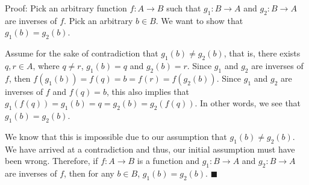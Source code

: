 \documentclass{article}
\renewcommand{\(}{\left(}
\renewcommand{\)}{\right)}
\theoremstyle{plain}
\theoremstyle{plain}
\theoremstyle{definition}
\begin{document}
    \begin{shaded}

        Proof: Pick an arbitrary function $f:A\to B$ such that $g_{1}:B\to A$ and $g_{2}:B\to A$ are inverses of $f$. Pick an arbitrary $b\in B$. We want to show that $g_{1}(b)=g_{2}(b)$.

        \vspace{4mm}

        Assume for the sake of contradiction that $g_{1}(b)\neq g_{2}(b)$, that is, there exists $q,r\in A$, where $q\neq r$, $g_{1}(b)=q$ and $g_{2}(b)=r$. Since $g_{1}$ and $g_{2}$ are inverses of $f$, then $f(g_{1}(b))=f(q)=b=f(r)=f(g_{2}(b))$. Since $g_{1}$ and $g_{2}$ are inverses of $f$ and $f(q)=b$, this also implies that $g_{1}(f(q))=g_{1}(b)=q=g_{2}(b)=g_{2}(f(q))$. In other words, we see that $g_{1}(b)=g_{2}(b)$.

        \vspace{4mm}

        We know that this is impossible due to our assumption that $g_{1}(b)\neq g_{2}(b)$. We have arrived at a contradiction and thus, our initial assumption must have been wrong. Therefore, if $f:A\to B$ is a function and $g_{1}:B\to A$ and $g_{2}:B\to A$ are inverses of $f$, then for any $b\in B$, $g_{1}(b)=g_{2}(b)$. $\blacksquare$
    \end{shaded}
\end{document}
